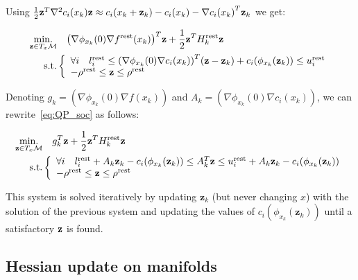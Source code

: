 Using $ \frac{1}{2}{\bf z}^T{\nabla}^2c_i(x_k){\bf z} \approx c_i(x_k+{\bf z}_k) - c_i(x_k) - {\nabla c_i(x_k)}^T {\bf z}_k $
we get:

\begin{align}
  \label{eq:QP_soc}
  \begin{split}
  \operatorname*{min.}_{\mathbf{z} \in T_x\mathcal{M} } &\quad {\left(\nabla\phi_{x_k}(0) \nabla f^\text{rest} (x_k)\right)}^T\mathbf{z} + \frac{1}{2} {\bf z }^T H^\text{rest}_k{\bf z }\\
  \text{s.t.}&\left\{
  \begin{array}{lr}
    \forall i \quad l^\text{rest}_i \leq {\left(\nabla\phi_{x_k}(0) \nabla c_i (x_k)\right)}^T(\mathbf{z} - \mathbf{z}_k) + c_i(\phi_{x_k}({\bf z}_k)) \leq u^\text{rest}_i \\
    -\rho^\text{rest} \leq \mathbf{z} \leq \rho^\text{rest} \\
  \end{array}\right.
  \end{split}
\end{align}

Denoting $g_k = {\left(\nabla\phi_{x_k}(0) \nabla f (x_k)\right)}$ and $A_k = {\left(\nabla\phi_{x_k}(0) \nabla c_i (x_k)\right)}$, we can rewrite~\ref{eq:QP_soc} as follows:

\begin{align}
  \label{eq:QP_soc_simple}
  \begin{split}
  \operatorname*{min.}_{\mathbf{z} \in T_x\mathcal{M} }& \quad g_k^T\mathbf{z} + \frac{1}{2} {\bf z }^T H^\text{rest}_k{\bf z }\\
  \text{s.t.}&\left\{
  \begin{array}{lr}
    \forall i \quad l^\text{rest}_i + A_k\mathbf{z}_k - c_i(\phi_{x_k}({\bf z}_k)) \leq A_k^T\mathbf{z}\leq u^\text{rest}_i+ A_k\mathbf{z}_k - c_i(\phi_{x_k}({\bf z}_k))  \\
    -\rho^\text{rest} \leq \mathbf{z} \leq \rho^\text{rest} \\
  \end{array}\right.
  \end{split}
\end{align}

This system is solved iteratively by updating $\mathbf{z}_k$ (but never changing $x$) with the solution of the previous system and updating the values of $c_i(\phi_{x_k}(\mathbf{z}_k))$ until a satisfactory $\bf z$ is found.

\subsection{Hessian update on manifolds}
\label{sub:hessian_update_on_manifolds}

